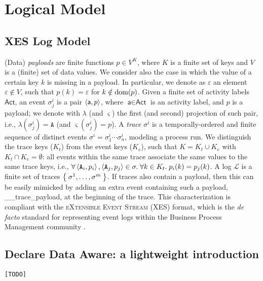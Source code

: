 \section{Logical Model}
\subsection{XES Log Model}\label{sec:XES}
(Data) \textit{payloads} are finite functions $p\in V^K$, where $K$ is a finite set of keys and $V$ is a (finite) set of data values. We consider also the case in which the value of a certain key $k$ is missing in a payload. In particular, we denote as $\varepsilon$ an element $\varepsilon\notin V$, such that $p(k)=\varepsilon$ for $k\notin\textup{dom}(p)$. Given a finite set of activity labels $\textsf{Act}$, an event $\sigma_j^{i}$ is a pair $\Braket{\textsf{a},p}$, where $\textsf{a}\in\textsf{Act}$ is an activity label, and $p$ is a payload; we denote with $\lambda$ (and $\varsigma$) the first (and second) projection of such pair, i.e., $\lambda(\sigma_j^{i})=\texttt{A}$ (and $\varsigma(\sigma_j^{i})=p$). A \textit{trace} $\sigma^i$ is a temporally-ordered and finite sequence of distinct events $\sigma^i=\sigma_1^i\cdots\sigma_n^i$, modeling a process run. We distinguish the trace keys ($K_t$) from the event keys ($K_e$), such that $K=K_t\cup K_e$ with $K_t\cap K_e=\emptyset$: all events within the same trace associate the same values to the same trace keys, i.e., $\forall \Braket{\texttt{A}_i,p_i},\Braket{\texttt{A}_j,p_j}\in\sigma.\;\forall k\in K_t.\; p_i(k)=p_j(k)$. A log $\mathcal{L}$ is a finite set of traces $\Set{\sigma^1,\dots,\sigma^m}$. If traces also contain a payload, then this can be easily mimicked by adding an extra event containing such a payload, \textsf{\_\_trace\_payload}, at the beginning of the trace. This  characterization \cite{bpm21} is compliant with the \textsc{eXtensible Event Stream} (XES) format, which is the \textit{de facto} standard for representing event logs within the Business Process Management community \cite{XES}. 

\subsection{Declare Data Aware: a lightweight introduction}
\texttt{\color{red}[TODO]}
